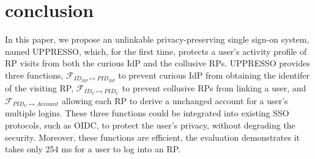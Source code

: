\section{conclusion}
\label{sec:conclusion}
In this paper, we propose an unlinkable privacy-preserving single sign-on system, named UPPRESSO, which, for the first time, protects a user's activity profile of RP visits from both the curious IdP and the collusive RPs.
UPPRESSO provides three functions, $\mathcal{F}_{ID_{RP} \mapsto PID_{RP}}$ to prevent curious IdP from obtaining the identifer of the visiting RP,
 $\mathcal{F}_{ID_{U} \mapsto PID_{U}}$ to prevent collusive RPs from linking a user, and $\mathcal{F}_{PID_{U} \mapsto Account}$ allowing each RP to derive a unchanged account for a user's multiple logins. 
These three functions could be integrated into existing SSO protocols, such as OIDC, to protect the user's privacy, without degrading the security.
Moreover, these functions are efficient, the evaluation demonstrates it takes only 254 ms for a user to log into an RP.
